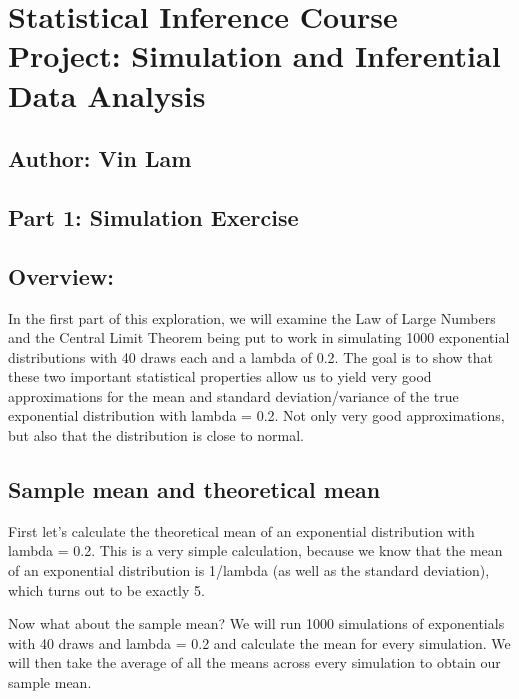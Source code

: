 \documentclass[
]{article}
\author{}
\date{\vspace{-2.5em}}
\begin{document}
\hypertarget{statistical-inference-course-project-simulation-and-inferential-data-analysis}{%
\section{Statistical Inference Course Project: Simulation and
Inferential Data
Analysis}\label{statistical-inference-course-project-simulation-and-inferential-data-analysis}}

\hypertarget{author-vin-lam}{%
\subsection{Author: Vin Lam}\label{author-vin-lam}}

\hypertarget{part-1-simulation-exercise}{%
\subsection{Part 1: Simulation
Exercise}\label{part-1-simulation-exercise}}

\hypertarget{overview}{%
\subsection{Overview:}\label{overview}}

In the first part of this exploration, we will examine the Law of Large
Numbers and the Central Limit Theorem being put to work in simulating
1000 exponential distributions with 40 draws each and a lambda of 0.2.
The goal is to show that these two important statistical properties
allow us to yield very good approximations for the mean and standard
deviation/variance of the true exponential distribution with lambda =
0.2. Not only very good approximations, but also that the distribution
is close to normal.

\hypertarget{sample-mean-and-theoretical-mean}{%
\subsection{Sample mean and theoretical
mean}\label{sample-mean-and-theoretical-mean}}

First let's calculate the theoretical mean of an exponential
distribution with lambda = 0.2. This is a very simple calculation,
because we know that the mean of an exponential distribution is 1/lambda
(as well as the standard deviation), which turns out to be exactly 5.

Now what about the sample mean? We will run 1000 simulations of
exponentials with 40 draws and lambda = 0.2 and calculate the mean for
every simulation. We will then take the average of all the means across
every simulation to obtain our sample mean.
\end{document}
